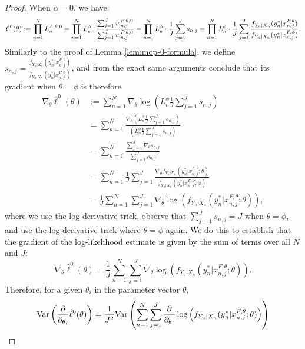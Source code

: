 \begin{proof}
When $\alpha=0$, we have:
\begin{equation}
    \hat{\mathcal{L}}^0(\theta) := \prod_{n=1}^N L_n^{A, \theta, 0} = \prod_{n=1}^N L_n^\phi \cdot \frac{\sum_{j=1}^J w_{n,j}^{F,\theta,0}}{\sum_{j=1}^J w_{n,j}^{P,\theta,0}} = \prod_{n=1}^N L_n^\phi \cdot \frac{1}{J}\sum_{j=1}^J s_{n,j} = \prod_{n=1}^N L_n^\phi \cdot \frac{1}{J}\sum_{j=1}^J \frac{f_{Y_n|X_n}(y_n^*|x_{n,j}^{P, \theta})}{f_{Y_n|X_n}(y_n^*|x_{n,j}^{P, \phi})}.
\end{equation}
Similarly to the proof of Lemma \ref{lem:mop-0-formula}, we define $s_{n,j}=\frac{f_{Y_n|X_n}(y_n^*|x_{n,j}^{P, \theta})}{f_{Y_n|X_n}(y_n^*|x_{n,j}^{P, \phi})}$, and from the exact same arguments conclude that its gradient when $\theta=\phi$ is therefore 
\begin{align}
    \nabla_\theta \hat{\ell}^0(\theta) &:= \sum_{n=1}^N \nabla_\theta \log\left(L_n^\phi \frac{1}{J} \sum_{j=1}^J s_{n,j}\right) \\
    &= \sum_{n=1}^N \frac{\nabla_\theta \left(L_n^\phi \frac{1}{J} \sum_{j=1}^J s_{n,j}\right)}{\left(L_n^\phi \frac{1}{J} \sum_{j=1}^J s_{n,j}\right)} \\
    &= \sum_{n=1}^N \frac{\sum_{j=1}^J \nabla_\theta s_{n,j}}{\sum_{j=1}^J s_{n,j}} \\
    &= \sum_{n=1}^N \frac{1}{J} \sum_{j=1}^J \frac{\nabla_\theta f_{Y_n|X_{n}}(y_n^*|x_{n,j}^{F, \theta}; \theta)}{f_{Y_n|X_{n}}(y_n^*|x_{n,j}^{F, \phi}; \phi)} \\
    &= \frac{1}{J} \sum_{n=1}^N \sum_{j=1}^J \nabla_\theta \log\left(f_{Y_n|X_{n}}(y_n^*|x_{n,j}^{F, \theta}; \theta)\right),
\end{align}
where we use the log-derivative trick, observe that $\sum_{j=1}^J s_{n,j} = J$ when $\theta=\phi$, and use the log-derivative trick where $\theta=\phi$ again. We do this to establish that the gradient of the log-likelihood estimate is given by the sum of terms over all $N$ and $J$:
\begin{equation}
\nabla_\theta \hat{\ell}^0(\theta) = \frac{1}{J} \sum_{n=1}^N \sum_{j=1}^J \nabla_\theta \log\left(f_{Y_n|X_{n}}(y_n^*|x_{n,j}^{F, \theta}; \theta)\right).
\end{equation}
Therefore, for a given $\theta_i$ in the parameter vector $\theta$,
\begin{align}
    \Var\left(\frac{\partial}{\partial_{\theta_i}} \hat\ell^0(\theta)\right) &= \frac{1}{J^2}\Var\left(\sum_{n=1}^N\sum_{j=1}^{J}\frac{\partial}{\partial_{\theta_i}} \log\left(f_{Y_n|X_{n}}(y_n^*|x_{n,j}^{F, \theta}; \theta)\right)\right) \\

\end{align}
\end{proof}
